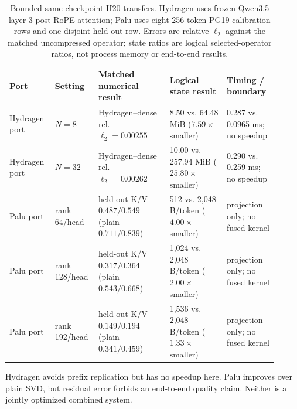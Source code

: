 \begin{table}[H]
\caption{Bounded same-checkpoint H20 transfers.  Hydragen uses frozen Qwen3.5
layer-3 post-RoPE attention; Palu uses eight 256-token PG19 calibration rows
and one disjoint held-out row.  Errors are relative $\ell_2$ against the
matched uncompressed operator; state ratios are logical selected-operator
ratios, not process memory or end-to-end results.}
\label{tab:related-transfer}
\centering\scriptsize
\setlength{\tabcolsep}{2.8pt}
\begin{tabular}{@{}p{0.16\linewidth}p{0.12\linewidth}p{0.25\linewidth}p{0.20\linewidth}p{0.18\linewidth}@{}}
\toprule
Port & Setting & Matched numerical result & Logical state result & Timing / boundary \\
\midrule
Hydragen port & $N=8$ & Hydragen--dense rel. $\ell_2=0.00255$ & 8.50 vs. 64.48 MiB ($7.59\times$ smaller) & 0.287 vs. 0.0965 ms; no speedup \\
Hydragen port & $N=32$ & Hydragen--dense rel. $\ell_2=0.00262$ & 10.00 vs. 257.94 MiB ($25.80\times$ smaller) & 0.290 vs. 0.259 ms; no speedup \\
\midrule
Palu port & rank 64/head & held-out K/V $0.487/0.549$ (plain $0.711/0.839$) & 512 vs. 2,048 B/token ($4.00\times$ smaller) & projection only; no fused kernel \\
Palu port & rank 128/head & held-out K/V $0.317/0.364$ (plain $0.543/0.668$) & 1,024 vs. 2,048 B/token ($2.00\times$ smaller) & projection only; no fused kernel \\
Palu port & rank 192/head & held-out K/V $0.149/0.194$ (plain $0.341/0.459$) & 1,536 vs. 2,048 B/token ($1.33\times$ smaller) & projection only; no fused kernel \\
\bottomrule
\end{tabular}
\vspace{0.5mm}
\parbox{0.97\textwidth}{\footnotesize Hydragen avoids prefix replication but
has no speedup here.  Palu improves over plain SVD, but residual error forbids
an end-to-end quality claim.  Neither is a jointly optimized combined system.}
\end{table}
